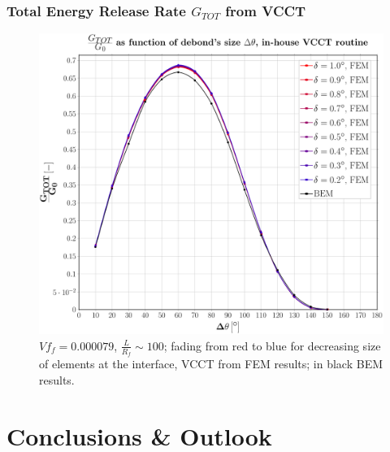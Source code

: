 \documentclass[first,firstsupp,lastsupp,last,hyperref,table]{ETHclass}
\begin{document}
\begin{frame}
\frametitle{\small Total Energy Release Rate $G_{TOT}$ from VCCT}
\vspace{-0.5cm}
\centering
\captionsetup[figure]{font=scriptsize,labelfont=scriptsize}
\begin{figure}[!h]
\centering
\includegraphics[height=0.7\textheight]{2017-07-10_AbqRunSummary_SmallStrain_M-F-VCCT_GTOT.pdf}
  \caption{\scriptsize $Vf_{f}=0.000079$, $\frac{L}{R_{f}}\sim 100$; fading from red to blue for decreasing size of elements at the interface, VCCT from FEM results; in black BEM results.}
  \label{fig:res1}
\end{figure}
\end{frame}

\section[Conclusions]{Conclusions \& Outlook}
\end{document}
